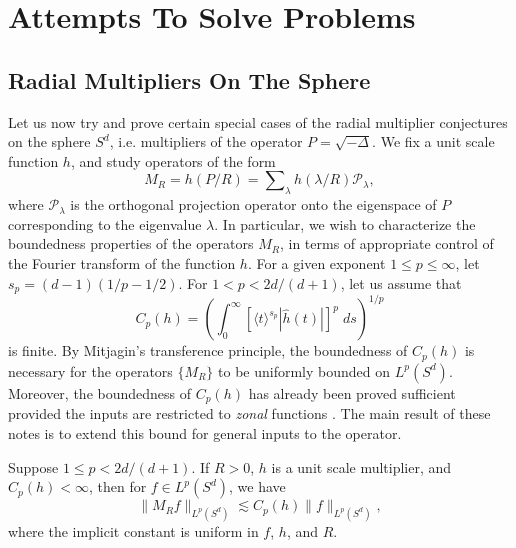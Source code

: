 \part{Attempts To Solve Problems}

\chapter{Radial Multipliers On The Sphere}

Let us now try and prove certain special cases of the radial multiplier conjectures on the sphere $S^d$, i.e. multipliers of the operator $P = \sqrt{-\Delta}$. We fix a unit scale function $h$, and study operators of the form
%
\[ M_R = h \left( P / R \right) = \sum\nolimits_\lambda h(\lambda / R) \mathcal{P}_\lambda, \]
%
where $\mathcal{P}_\lambda$ is the orthogonal projection operator onto the eigenspace of $P$ corresponding to the eigenvalue $\lambda$. In particular, we wish to characterize the boundedness properties of the operators $M_R$, in terms of appropriate control of the Fourier transform of the function $h$. For a given exponent $1 \leq p \leq \infty$, let $s_p = (d-1)(1/p - 1/2)$. For $1 < p < 2d/(d+1)$, let us assume that
%
\[ C_p(h) = \left( \int_0^\infty \left[ \langle t \rangle^{s_p} |\widehat{h}(t)| \right]^p\; ds \right)^{1/p} \]
%
is finite. By Mitjagin's transference principle, the boundedness of $C_p(h)$ is necessary for the operators $\{ M_R \}$ to be uniformly bounded on $L^p(S^d)$. Moreover, the boundedness of $C_p(h)$ has already been proved sufficient provided the inputs are restricted to \emph{zonal} functions \cite{Alladi}. The main result of these notes is to extend this bound for general inputs to the operator.

\begin{theorem} \label{MainSphereTheorem}
    Suppose $1 \leq p < 2d/(d+1)$. If $R > 0$, $h$ is a unit scale multiplier, and $C_p(h) < \infty$, then for $f \in L^p(S^d)$, we have
    \[ \| M_R f \|_{L^p(S^d)} \lesssim C_p(h) \| f \|_{L^p(S^d)}, \]
    where the implicit constant is uniform in $f$, $h$, and $R$.
\end{theorem}

